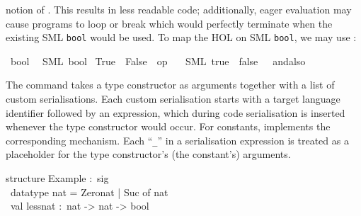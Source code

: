 \begin{isabellebody}
\begin{isamarkuptext}
  notion of .  This results in less readable code;
  additionally, eager evaluation may cause programs to loop or break
  which would perfectly terminate when the existing SML \verb|bool| would be used.  To map the HOL  on SML \verb|bool|, we may use :%
\end{isamarkuptext}%
\isamarkuptrue%
%
\isadelimquotett
%
\endisadelimquotett
%
\isatagquotett
{}\isamarkupfalse%
\ bool\isanewline
\ \ {\isacharparenleft}SML\ {\isachardoublequoteopen}bool{\isachardoublequoteclose}{\isacharparenright}\isanewline
{}\isamarkupfalse%
\ True\ \ False\ \ {\isachardoublequoteopen}op\ {\isasymand}{\isachardoublequoteclose}\isanewline
\ \ {\isacharparenleft}SML\ {\isachardoublequoteopen}true{\isachardoublequoteclose}\ \ {\isachardoublequoteopen}false{\isachardoublequoteclose}\ \ {\isachardoublequoteopen}{\isacharunderscore}\ andalso\ {\isacharunderscore}{\isachardoublequoteclose}{\isacharparenright}%
\endisatagquotett
{\isafoldquotett}%
%
\isadelimquotett
%
\endisadelimquotett
%
\begin{isamarkuptext}%
\noindent The \hypertarget{command.code-type}{\hyperlink{command.code-type}{\mbox{}}} command takes a type constructor
  as arguments together with a list of custom serialisations.  Each
  custom serialisation starts with a target language identifier
  followed by an expression, which during code serialisation is
  inserted whenever the type constructor would occur.  For constants,
  \hypertarget{command.code-const}{\hyperlink{command.code-const}{\mbox{}}} implements the corresponding mechanism.  Each
  ``\verb|_|'' in a serialisation expression is treated as a
  placeholder for the type constructor's (the constant's) arguments.%
\end{isamarkuptext}%
\isamarkuptrue%
%
\isadelimquote
%
\endisadelimquote
%
\isatagquote
%
\begin{isamarkuptext}%
\isatypewriter%
\noindent%
\hspace*{0pt}structure Example :~sig\\
\hspace*{0pt} ~datatype nat = Zero{}nat | Suc of nat\\
\hspace*{0pt} ~val less{}nat :~nat -> nat -> bool\\

\end{isamarkuptext}
\end{isabellebody}
